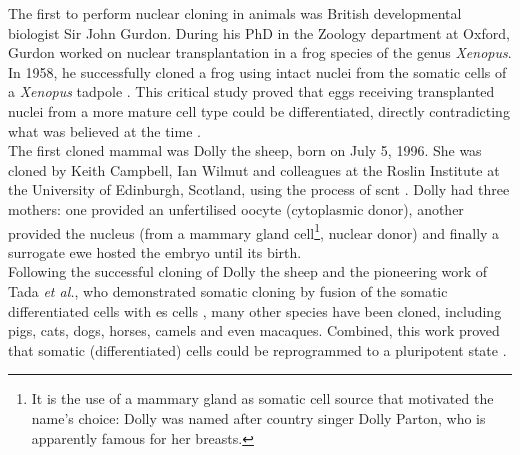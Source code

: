 The first to perform nuclear cloning in animals was British developmental biologist Sir John Gurdon. 
During his PhD in the Zoology department at Oxford, Gurdon worked on nuclear transplantation in a frog species of the genus \textit{Xenopus}.
In 1958, he successfully cloned a frog using intact nuclei from the somatic cells of a \textit{Xenopus} tadpole \cite{gurdon1962developmental}.
This critical study proved that eggs receiving transplanted nuclei from a more mature cell type could be differentiated, directly contradicting what was believed at the time \cite{king1955changes}. \\

The first cloned mammal was Dolly the sheep, born on July 5, 1996.
She was cloned by Keith Campbell, Ian Wilmut and colleagues at the Roslin Institute at the University of Edinburgh, Scotland, using the process of \gls{scnt} \cite{wilmut1997viable}.
Dolly had three mothers: one provided an unfertilised oocyte (cytoplasmic donor), another provided the nucleus (from a mammary gland cell\footnote{It is the use of a mammary gland as somatic cell source that motivated the name's choice: Dolly was named after country singer Dolly Parton, who is apparently famous for her breasts.}, nuclear donor) and finally a surrogate ewe hosted the embryo until its birth.\\

Following the successful cloning of Dolly the sheep and the pioneering work of Tada \textit{et al.}, who demonstrated somatic cloning by fusion of the somatic differentiated cells with \gls{es} cells \cite{tada2001nuclear}, many other species have been cloned, including pigs, cats, dogs, horses, camels and even macaques.
Combined, this work proved that somatic (differentiated) cells could be reprogrammed to a pluripotent state \cite{cowan2005nuclear}.\\



